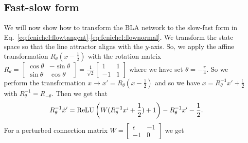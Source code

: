 \documentclass{article} %
\newcounter{ct}
\theoremstyle{definition}
\theoremstyle{remark}
\begin{document}
\subsection{Fast-slow form}\label{sec:supp:fast_slow_form}
We will now show how to transform the BLA network to the slow-fast form in Eq.~\ref{eq:fenichel:flowtangent}-\ref{eq:fenichel:flownormal}.
We transform the state space so that the line attractor aligns with the \(y\)-axis.
So, we apply the affine transformation \(R_\theta(x-\frac{1}{2})\) with the rotation matrix \(R_\theta = \begin{bmatrix}\cos\theta &-\sin\theta\\\sin\theta&\cos\theta\end{bmatrix}= \frac{1}{\sqrt{2}}\begin{bmatrix}1 &1\\-1&1\end{bmatrix}\) where we have set \(\theta=-\frac{\pi}{4}\).
So we perform the transformation \(x\rightarrow x'= R_\theta(x-\frac{1}{2})\) and so we have \(x=R^{-1}_\theta x'+\frac{1}{2}\) with \(R^{-1}_\theta = R_{-\theta}\).
Then we get that
\begin{align}
R_{\theta}^{-1}\dot x' = \operatorname{ReLU}\left(W(R^{-1}_\theta x`+\frac{1}{2})+1\right)-R^{-1}_\theta x'-\frac{1}{2}.
\end{align}
For a perturbed connection matrix \(W=\begin{bmatrix}\epsilon &-1\\-1&0\end{bmatrix}\) we get
\end{document}
